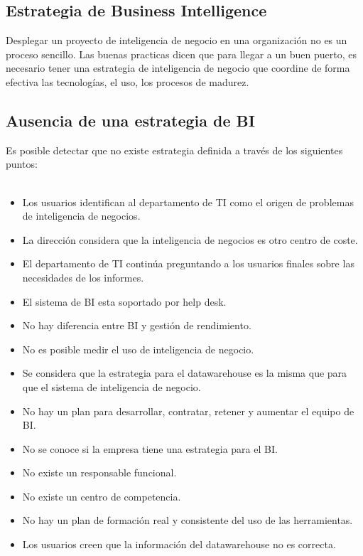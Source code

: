 \documentclass[preprint,12pt]{elsarticle}
\begin{document}
	\subsection{Estrategia de Business Intelligence}
	Desplegar un proyecto de inteligencia de negocio en una organización no es un proceso sencillo. Las buenas practicas dicen 
	que para llegar a un buen puerto, es necesario tener una estrategia de inteligencia de negocio que coordine de forma efectiva 
	las tecnologías, el uso, los procesos de madurez.\cite{referenciarobles2}
	\subsection{Ausencia de una estrategia de BI}
	Es posible detectar que no existe estrategia definida a través de los siguientes puntos:
\\
\\
	\begin{itemize}
	\item Los usuarios identifican al departamento de TI como el origen de problemas de inteligencia de negocios.
	\item La dirección considera que la inteligencia de negocios es otro centro de coste.
	\item El departamento de TI continúa preguntando a los usuarios finales sobre las necesidades de los informes.
	\item El sistema de BI esta soportado por help desk.
	\item No hay diferencia entre BI y gestión de rendimiento.
	\item No es posible medir el uso de inteligencia de negocio.
	\item Se considera que la estrategia para el datawarehouse es la misma que para que el sistema de inteligencia de negocio.

	\item No hay un plan para desarrollar, contratar, retener y aumentar el equipo de BI.
	\item No se conoce si la empresa tiene una estrategia para el BI.
	\item No existe un responsable funcional.
	\item No existe un centro de competencia.
	\item No hay un plan de formación real y consistente del uso de las herramientas.
	\item Los usuarios creen que la información del datawarehouse no es correcta.
	\end{itemize}
\end{document}
